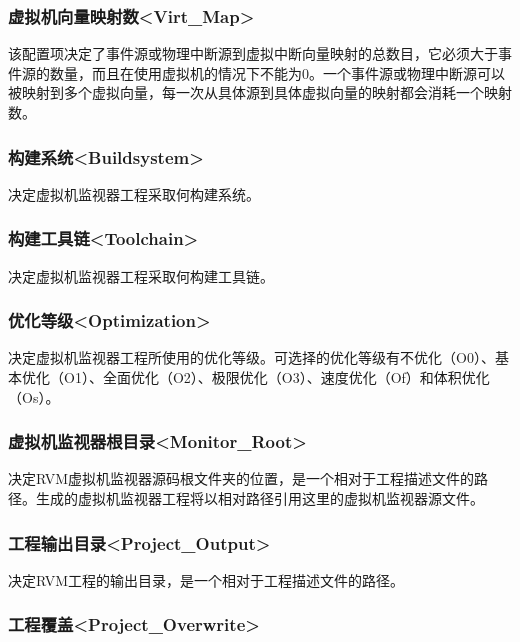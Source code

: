 \subsubsection{虚拟机向量映射数<Virt\_Map>{}}\label{subsubsec:5-3-13-10}

该配置项决定了事件源或物理中断源到虚拟中断向量映射的总数目，它必须大于事件源的数量，而且在使用虚拟机的情况下不能为0。一个事件源或物理中断源可以被映射到多个虚拟向量，每一次从具体源到具体虚拟向量的映射都会消耗一个映射数。

\subsubsection{构建系统<Buildsystem>{}}\label{subsubsec:5-3-13-11}

决定虚拟机监视器工程采取何构建系统。

\subsubsection{构建工具链<Toolchain>{}}\label{subsubsec:5-3-13-12}

决定虚拟机监视器工程采取何构建工具链。

\subsubsection{优化等级<Optimization>{}}\label{subsubsec:5-3-13-13}

决定虚拟机监视器工程所使用的优化等级。可选择的优化等级有不优化（O0）、基本优化（O1）、全面优化（O2）、极限优化（O3）、速度优化（Of）和体积优化（Os）。

\subsubsection{虚拟机监视器根目录<Monitor\_Root>{}}\label{subsubsec:5-3-13-14}

决定RVM虚拟机监视器源码根文件夹的位置，是一个相对于工程描述文件的路径。生成的虚拟机监视器工程将以相对路径引用这里的虚拟机监视器源文件。

\subsubsection{工程输出目录<Project\_Output>{}}\label{subsubsec:5-3-13-15}

决定RVM工程的输出目录，是一个相对于工程描述文件的路径。

\subsubsection{工程覆盖<Project\_Overwrite>{}}\label{subsubsec:5-3-13-16}

